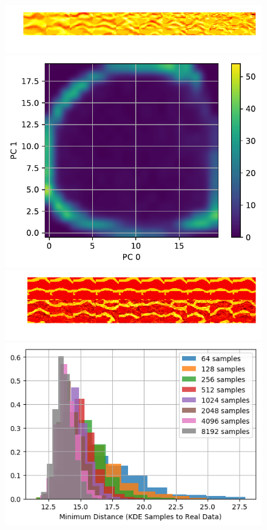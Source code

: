 \documentclass{article}
\begin{document}
\begin{figure}[h]
\centering
  \includegraphics[]{figures/GeneratedSnapshots_Modes.png}
  \includegraphics[]{figures/GeneratedSnapshots.pdf}
  \includegraphics[]{figures/GeneratedSnapshots_KDESamples100.png}
  \includegraphics[]{figures/GeneratedSnapshots_KDESamplesPWD100.png}

\end{figure}
\end{document}

